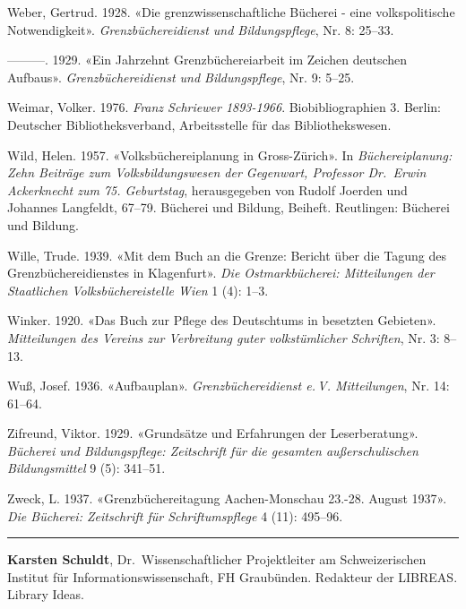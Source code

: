 \documentclass[a4paper,
fontsize=11pt,
oneside,
numbers=noperiodatend,
parskip=half-,
bibliography=totoc,
final
]{scrartcl}
\begin{document}
Weber, Gertrud. 1928. «Die grenzwissenschaftliche Bücherei - eine
volkspolitische Notwendigkeit». \emph{Grenzbüchereidienst und
Bildungspflege}, Nr. 8: 25--33.

---------. 1929. «Ein Jahrzehnt Grenzbüchereiarbeit im Zeichen deutschen
Aufbaus». \emph{Grenzbüchereidienst und Bildungspflege}, Nr. 9: 5--25.

Weimar, Volker. 1976. \emph{Franz Schriewer 1893-1966}.
Biobibliographien 3. Berlin: Deutscher Bibliotheksverband, Arbeitsstelle
für das Bibliothekswesen.

Wild, Helen. 1957. «Volksbüchereiplanung in Gross-Zürich». In
\emph{Büchereiplanung: Zehn Beiträge zum Volksbildungswesen der
Gegenwart, Professor Dr.~Erwin Ackerknecht zum 75. Geburtstag},
herausgegeben von Rudolf Joerden und Johannes Langfeldt, 67--79.
Bücherei und Bildung, Beiheft. Reutlingen: Bücherei und Bildung.

Wille, Trude. 1939. «Mit dem Buch an die Grenze: Bericht über die Tagung
des Grenzbüchereidienstes in Klagenfurt». \emph{Die Ostmarkbücherei:
Mitteilungen der Staatlichen Volksbüchereistelle Wien} 1 (4): 1--3.

Winker. 1920. «Das Buch zur Pflege des Deutschtums in besetzten
Gebieten». \emph{Mitteilungen des Vereins zur Verbreitung guter
volkstümlicher Schriften}, Nr. 3: 8--13.

Wuß, Josef. 1936. «Aufbauplan». \emph{Grenzbüchereidienst e.\,V.
Mitteilungen}, Nr. 14: 61--64.

Zifreund, Viktor. 1929. «Grundsätze und Erfahrungen der Leserberatung».
\emph{Bücherei und Bildungspflege: Zeitschrift für die gesamten
außerschulischen Bildungsmittel} 9 (5): 341--51.

Zweck, L. 1937. «Grenzbüchereitagung Aachen-Monschau 23.-28. August
1937». \emph{Die Bücherei: Zeitschrift für Schriftumspflege} 4 (11):
495--96.

\begin{center}\rule{0.5\linewidth}{0.5pt}\end{center}

\textbf{Karsten Schuldt}, Dr.~Wissenschaftlicher Projektleiter am
Schweizerischen Institut für Informationswissenschaft, FH Graubünden.
Redakteur der LIBREAS. Library Ideas.
\end{document}
